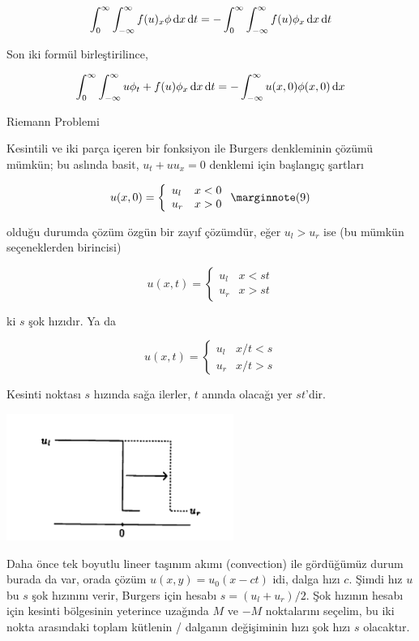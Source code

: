 \documentclass[12pt,fleqn]{article}\usepackage{../../common}
\begin{document}
$$
\int_{0}^{\infty} \int_{-\infty}^{\infty}
f(u)_x \phi \,\mathrm{d} x \,\mathrm{d} t =
- \int_{0}^{\infty} \int_{-\infty}^{\infty} f(u) \phi_x \,\mathrm{d} x \,\mathrm{d} t
$$

Son iki formül birleştirilince,

$$
\int_{0}^{\infty} \int_{-\infty}^{\infty}
u \phi_t + f(u) \phi_x \,\mathrm{d} x \,\mathrm{d} t = -
\int_{-\infty}^{\infty} u(x,0) \phi(x,0) \,\mathrm{d} x 
$$

Riemann Problemi

Kesintili ve iki parça içeren bir fonksiyon ile Burgers denkleminin çözümü
mümkün; bu aslında basit, $u_t + u u_x = 0$ denklemi için başlangıç şartları

$$
u(x,0) = 
\left\{ \begin{array}{ll}
u_l & x < 0 \\
u_r & x > 0 
\end{array} \right.
\mlabel{9}
$$

olduğu durumda çözüm özgün bir zayıf çözümdür, eğer $u_l > u_r$ ise (bu mümkün
seçeneklerden birincisi)

$$
u(x,t) = 
\left\{ \begin{array}{ll}
u_l & x < st \\
u_r & x > st 
\end{array} \right.
$$

ki $s$ şok hızıdır. Ya da

$$
u(x,t) = 
\left\{ \begin{array}{ll}
u_l & x/t < s \\
u_r & x/t > s 
\end{array} \right.
$$

Kesinti noktası $s$ hızında sağa ilerler, $t$ anında olacağı yer $st$'dir.

\includegraphics[width=20em]{compscieng_bpp50fv1_01.png}

Daha önce tek boyutlu lineer taşınım akımı (convection) ile gördüğümüz durum
burada da var, orada çözüm $u(x,y) = u_0(x-ct)$ idi, dalga hızı $c$. Şimdi hız
$u$ bu $s$ şok hızınını verir, Burgers için hesabı $s = (u_l + u_r) / 2$.  Şok
hızının hesabı için kesinti bölgesinin yeterince uzağında $M$ ve $-M$ noktalarını
seçelim, bu iki nokta arasındaki toplam kütlenin / dalganın değişiminin hızı şok
hızı $s$ olacaktır.
\end{document}
